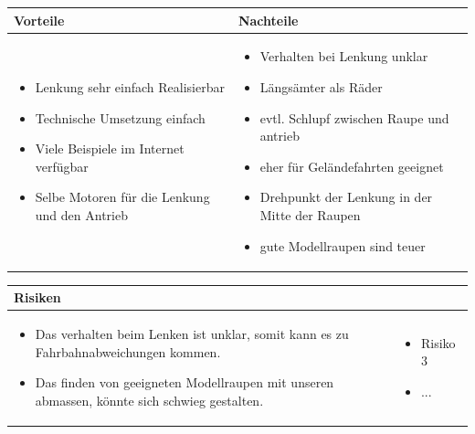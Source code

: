 \begin{table}[h]
\begin{tabular}{p{} | p{}}


 \textbf{Vorteile} & \textbf{Nachteile} \\ \hline
	 
\begin{itemize}
\item Lenkung sehr einfach Realisierbar
\item Technische Umsetzung einfach
\item Viele Beispiele im Internet verfügbar
\item Selbe Motoren für die Lenkung und den Antrieb
\end{itemize}

 
 &
 
\begin{itemize}
\item Verhalten bei Lenkung unklar
\item Längsämter als Räder
\item evtl. Schlupf zwischen Raupe und antrieb
\item eher für Geländefahrten geeignet
\item Drehpunkt der Lenkung in der Mitte der Raupen
\item gute Modellraupen sind teuer
\end{itemize}

\end{tabular}
\end{table}

\begin{table}[h]
\begin{tabular}{p{}p{}}


 \textbf{Risiken} & \\ \hline
	 
\begin{itemize}
\item Das verhalten beim Lenken ist unklar, somit kann es zu Fahrbahnabweichungen kommen.
\item Das finden von geeigneten Modellraupen mit unseren abmassen, könnte sich schwieg gestalten.
\end{itemize}
&
\begin{itemize}
\item Risiko 3
\item ...
\end{itemize}

 
\end{tabular}
\end{table}

